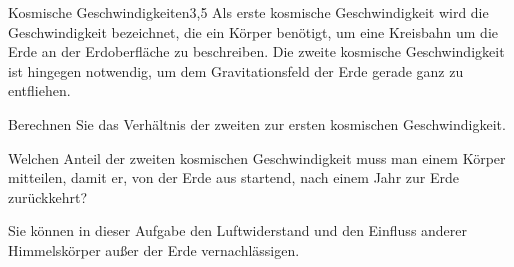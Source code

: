 


\begin{problem}{Kosmische Geschwindigkeiten}{3,5}
Als erste kosmische Geschwindigkeit wird die Geschwindigkeit bezeichnet, die ein Körper benötigt, um eine Kreisbahn um die Erde an der Erdoberfläche zu beschreiben.  Die zweite kosmische Geschwindigkeit ist hingegen notwendig, um dem Gravitationsfeld der Erde gerade ganz zu entfliehen.
\begin{abcenum}
  \item Berechnen Sie das Verhältnis der zweiten zur ersten kosmischen Geschwindigkeit.
  \item Welchen Anteil der zweiten kosmischen Geschwindigkeit muss man einem Körper mitteilen, damit er, von der Erde aus startend, nach einem Jahr zur Erde zurückkehrt?
\end{abcenum}

Sie können in dieser Aufgabe den Luftwiderstand und den Einfluss anderer Himmelskörper außer der Erde vernachlässigen.


\end{problem}
